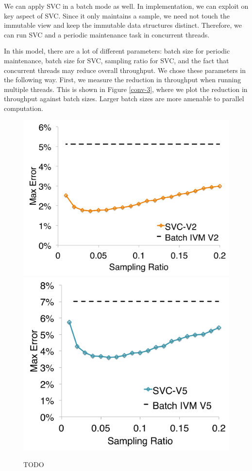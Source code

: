We can apply SVC in a batch mode as well.
In implementation, we can exploit on key aspect of SVC.
Since it only maintains a sample, we need not touch the immutable view and keep the immutable data structures
distinct.
Therefore, we can run SVC and a periodic maintenance task in concurrent threads.

In this model, there are a lot of different parameters: batch size for periodic maintenance, batch size for SVC, sampling ratio for SVC, and the fact that concurrent threads may reduce overall throughput.
We chose these parameters in the following way.
First, we measure the reduction in throughput when running multiple threads.
This is shown in Figure \ref{conv-3}, where we plot the reduction in throughput against batch sizes.
Larger batch sizes are more amenable to parallel computation.

\begin{figure}[t]
\centering
 \includegraphics[scale=0.14]{exp/con_5.pdf}
 \includegraphics[scale=0.14]{exp/con_6.pdf}
 \caption{TODO \label{conv-4}} 
\end{figure}

